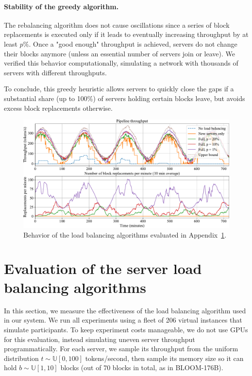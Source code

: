 \paragraph{Stability of the greedy algorithm.} The rebalancing algorithm does not cause oscillations since a series of block replacements is executed only if it leads to eventually increasing throughput by at least $p\%$. Once a "good enough" throughput is achieved, servers do not change their blocks anymore (unless an essential number of servers join or leave). We verified this behavior computationally, simulating a network with thousands of servers with different throughputs.

To conclude, this greedy heuristic allows servers to quickly close the gaps if a substantial share (up to 100\%) of servers holding certain blocks leave, but avoids excess block replacements otherwise.

\begin{figure}[tb]
    \centering
    \includegraphics[width=\linewidth]{resources/load_balancing_exps.pdf}
    \vspace{-12pt}
    \caption{Behavior of the load balancing algorithms evaluated in Appendix~\ref{appendix:load_balancing_exps}.}
    \label{fig:load_balancing_exps}
    \vspace{-6px}
\end{figure}


\section{Evaluation of the server load balancing algorithms}\label{appendix:load_balancing_exps}

In this section, we measure the effectiveness of the load balancing algorithm used in our system. We run all experiments using a fleet of 206 virtual instances that simulate participants. To keep experiment costs manageable, we do not use GPUs for this evaluation, instead simulating uneven server throughput programmatically. For each server, we sample its throughput from the uniform distribution $t \sim \mathbb{U}[0, 100]$ tokens/second, then sample its memory size so it can hold $b \sim \mathbb{U}[1, 10]$ blocks (out of 70 blocks in total, as in BLOOM-176B).

